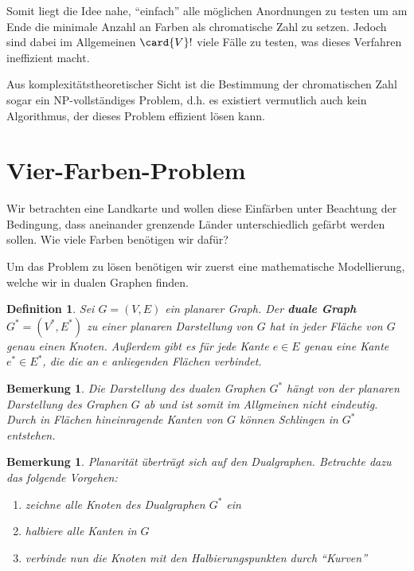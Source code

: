 \documentclass[ngerman, a4paper, 12pt]{article}
\newcommand{\begriff}[1]{\textbf{#1}}
\newcounter{themcount}
\theoremstyle{plain}
\newtheorem{definition}[themcount]{Definition}
\newtheorem{bemerkung}[themcount]{Bemerkung}
\theoremstyle{break}
\theoremstyle{proofstyle}
\begin{document}
	Somit liegt die Idee nahe, \enquote{einfach} alle möglichen Anordnungen zu testen um am Ende die minimale Anzahl an Farben als chromatische Zahl zu setzen. Jedoch sind dabei im Allgemeinen $\card{V}!$ viele Fälle zu testen, was dieses Verfahren ineffizient macht.
	
	Aus komplexitätstheoretischer Sicht ist die Bestimmung der chromatischen Zahl sogar ein NP-vollständiges Problem, d.h. es existiert vermutlich auch kein Algorithmus, der dieses Problem effizient lösen kann.
	
\pagebreak

	\section{Vier-Farben-Problem}
	
	Wir betrachten eine Landkarte und wollen diese Einfärben unter Beachtung der Bedingung, dass aneinander grenzende Länder unterschiedlich gefärbt werden sollen. Wie viele Farben benötigen wir dafür?
	
	Um das Problem zu lösen benötigen wir zuerst eine mathematische Modellierung, welche wir in dualen Graphen finden.
	
	\begin{definition}
		Sei $G = (V,E)$ ein planarer Graph. Der \begriff{duale Graph} $G^\ast = (V^\ast, E^\ast)$ zu einer planaren Darstellung von $G$ hat in jeder Fläche von $G$ genau einen Knoten. Außerdem gibt es für jede Kante $e \in E$ genau eine Kante $e^\ast \in E^\ast$, die die an $e$ anliegenden Flächen verbindet.
	\end{definition}

	\begin{bemerkung}
		Die Darstellung des dualen Graphen $G^\ast$ hängt von der planaren Darstellung des Graphen $G$ ab und ist somit im Allgmeinen nicht eindeutig. Durch in Flächen hineinragende Kanten von $G$ können Schlingen in $G^\ast$ entstehen. 
	\end{bemerkung}

	\begin{bemerkung}
		Planarität überträgt sich auf den Dualgraphen. Betrachte dazu das folgende Vorgehen:
		\begin{enumerate}[nolistsep, topsep=-\parskip]
			\item zeichne alle Knoten des Dualgraphen $G^\ast$ ein
			\item halbiere alle Kanten in $G$
			\item verbinde nun die Knoten mit den Halbierungspunkten durch \enquote{Kurven}
		\end{enumerate}
	\end{bemerkung}
\end{document}
